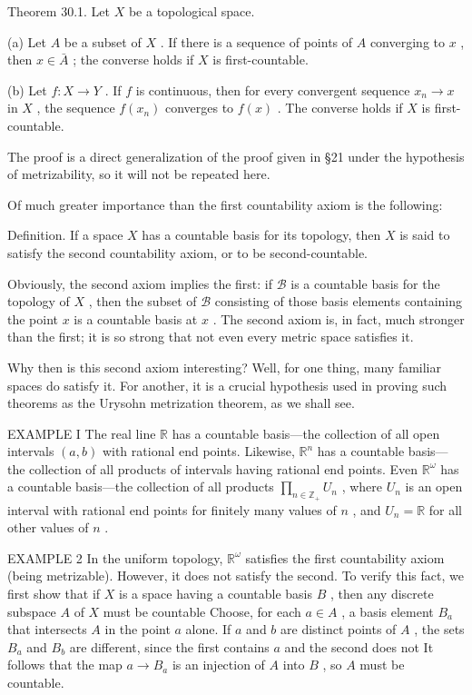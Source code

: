 \documentclass[10pt]{article}
\begin{document}
Theorem 30.1. Let \(X\) be a topological space.

(a) Let \(A\) be a subset of \(X\) . If there is a sequence of points of \(A\) converging to \(x\) , then \(x \in  \bar{A}\) ; the converse holds if \(X\) is first-countable.

(b) Let \(f : X \rightarrow  Y\) . If \(f\) is continuous, then for every convergent sequence \({x}_{n} \rightarrow  x\) in \(X\) , the sequence \(f\left( {x}_{n}\right)\) converges to \(f\left( x\right)\) . The converse holds if \(X\) is first-countable.

The proof is a direct generalization of the proof given in §21 under the hypothesis of metrizability, so it will not be repeated here.

Of much greater importance than the first countability axiom is the following:

Definition. If a space \(X\) has a countable basis for its topology, then \(X\) is said to satisfy the second countability axiom, or to be second-countable.

Obviously, the second axiom implies the first: if \(\mathcal{B}\) is a countable basis for the topology of \(X\) , then the subset of \(\mathcal{B}\) consisting of those basis elements containing the point \(x\) is a countable basis at \(x\) . The second axiom is, in fact, much stronger than the first; it is so strong that not even every metric space satisfies it.

Why then is this second axiom interesting? Well, for one thing, many familiar spaces do satisfy it. For another, it is a crucial hypothesis used in proving such theorems as the Urysohn metrization theorem, as we shall see.

EXAMPLE I The real line \(\mathbb{R}\) has a countable basis—the collection of all open intervals \(\left( {a,b}\right)\) with rational end points. Likewise, \({\mathbb{R}}^{n}\) has a countable basis—the collection of all products of intervals having rational end points. Even \({\mathbb{R}}^{\omega }\) has a countable basis—the collection of all products \(\mathop{\prod }\limits_{{n \in  {\mathbb{Z}}_{ + }}}{U}_{n}\) , where \({U}_{n}\) is an open interval with rational end points for finitely many values of \(n\) , and \({U}_{n} = \mathbb{R}\) for all other values of \(n\) .

EXAMPLE 2 In the uniform topology, \({\mathbb{R}}^{\omega }\) satisfies the first countability axiom (being metrizable). However, it does not satisfy the second. To verify this fact, we first show that if \(X\) is a space having a countable basis \(B\) , then any discrete subspace \(A\) of \(X\) must be countable Choose, for each \(a \in  A\) , a basis element \({B}_{a}\) that intersects \(A\) in the point \(a\) alone. If \(a\) and \(b\) are distinct points of \(A\) , the sets \({B}_{a}\) and \({B}_{b}\) are different, since the first contains \(a\) and the second does not It follows that the map \(a \rightarrow  {B}_{a}\) is an injection of \(A\) into \(B\) , so \(A\) must be countable.
\end{document}
